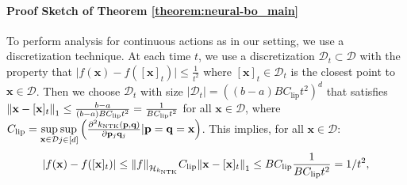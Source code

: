  \paragraph{Proof Sketch of Theorem \ref{theorem:neural-bo_main}}
To perform analysis for continuous actions as in our setting, we use a discretization technique. At each time $t$, we use a discretization $\mathcal{D}_t \subset \mathcal{D}$ with the property that $\lvert f(\mathbf{x}) - f([\mathbf{x}]_t) \rvert \leq \frac{1}{t^2}$ where $[\mathbf{x}]_t \in \mathcal{D}_t$ is the closest point to $\mathbf{x} \in \mathcal{D}$. Then we choose $\mathcal{D}_t $ 
with size $\lvert \mathcal{D}_t \rvert = \left( (b-a)BC_{\text{lip}}t^2 \right)^d$ that satisfies $\norm{\mathbf{x} - [\mathbf{x}]_t}_1 \leq \frac{b-a}{(b-a)BC_{\text{lip}}t^2} = \frac{1}{BC_{\text{lip}}t^2}$ for all $\mathbf{x} \in \mathcal{D}$,
where $C_{\text{lip}}= \underset{\mathbf{x} \in \mathcal{D}} {\operatorname*{sup}} \underset{j \in [d]} {\operatorname*{sup}} \left( \frac{\partial^2 k_\text{NTK}(\mathbf{p},\mathbf{q})}{\partial \mathbf{p}_j \mathbf{q}_j} \lvert \mathbf{p}=\mathbf{q}=\mathbf{x} \right)$. This implies, for all $\mathbf{x} \in \mathcal{D}$:
\begin{equation}
\label{eqn:neural-bo_rkhs_lipschitz}
    \lvert f(\mathbf{x}) - f([\mathbf{x}]_t) \rvert \leq \norm{f}_{\mathcal{H}_{k_\textup{NTK}}} C_{\text{lip}} \norm{\mathbf{x} - [\mathbf{x}]_t}_1 \leq BC_{\text{lip}} \frac{1}{BC_{\text{lip}}t^2} =  1/t^2, 
\end{equation}
